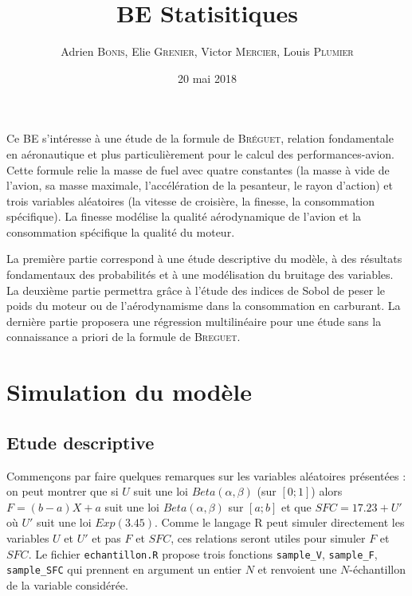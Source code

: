 \documentclass{article}
\title{BE Statisitiques}
\author{Adrien \textsc{Bonis}, Elie \textsc{Grenier}, Victor \textsc{Mercier}, Louis \textsc{Plumier}}
\date{20 mai 2018}
\begin{document}
\maketitle

\setcounter{tocdepth}{5}
\renewcommand{\contentsname}{Sommaire}


\tableofcontents


\listoffigures
\listoftables 
\break


Ce BE s'intéresse à une étude de la formule de \textsc{Bréguet}, relation fondamentale en aéronautique et plus particulièrement pour le calcul des performances-avion. Cette formule relie la masse de fuel avec quatre constantes (la masse à vide de l'avion, sa masse maximale, l'accélération de la pesanteur, le rayon d'action) et trois variables aléatoires (la vitesse de croisière, la finesse, la consommation spécifique). La finesse modélise la qualité aérodynamique de l'avion et la consommation spécifique la qualité du moteur.

La première partie correspond à une étude descriptive du modèle, à des résultats fondamentaux des probabilités et à une modélisation du bruitage des variables. La deuxième partie permettra grâce à l'étude des indices de Sobol de peser le poids du moteur ou de l'aérodynamisme dans la consommation en carburant. La dernière partie proposera une régression multilinéaire pour une étude sans la connaissance a priori de la formule de \textsc{Breguet}. 
\section{Simulation du modèle}
\subsection{Etude descriptive}

Commençons par faire quelques remarques sur les variables aléatoires présentées : on peut montrer que si $U$ suit une loi $Beta(\alpha,\beta)$ (sur $[0;1]$) alors $F=(b-a)X+a$ suit une loi $Beta(\alpha,\beta)$ sur $[a;b]$ et que $SFC=17.23+U'$ où $U'$ suit une loi $Exp(3.45)$. Comme le langage R peut simuler directement les variables $U$ et $U'$ et pas $F$ et $SFC$, ces relations seront utiles pour simuler $F$ et $SFC$. Le fichier \texttt{echantillon.R} propose trois fonctions \texttt{sample\_V}, \texttt{sample\_F}, \texttt{sample\_SFC} qui prennent en argument un entier $N$ et renvoient une $N$-échantillon de la variable considérée.
\end{document}
